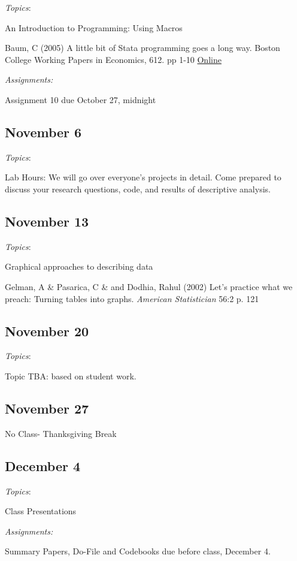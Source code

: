 \documentclass[12pt]{article}
\begin{document}
\begin{flushleft}
\textit{Topics}:

An Introduction to Programming: Using Macros

Baum, C (2005) A little bit of Stata programming goes a long
way. Boston College Working Papers in Economics, 612. pp 1-10 \href{http://fmwww.bc.edu/EC-P/WP612.pdf}{Online} 

\textit {Assignments:}

Assignment 10 due October 27, midnight

\subsection{November 6}


\textit{Topics}:

Lab Hours: We will go over everyone's projects in detail. Come
prepared to discuss your research questions, code, and results of
descriptive analysis.

\subsection{November 13}

\textit{Topics}:

Graphical approaches to describing data 


Gelman, A \&  Pasarica, C \& and Dodhia, Rahul (2002) Let's practice
what we preach: Turning tables into graphs. \textit{American
  Statistician} 56:2 p. 121

\subsection{November 20}


\textit{Topics}:

Topic TBA: based on student work. 


\subsection{November 27}

No Class- Thanksgiving Break

\subsection{December 4}

\textit{Topics}:

Class Presentations

\textit {Assignments:}

Summary Papers, Do-File and Codebooks due before class, December 4. 


\end{flushleft}
\end{document}
